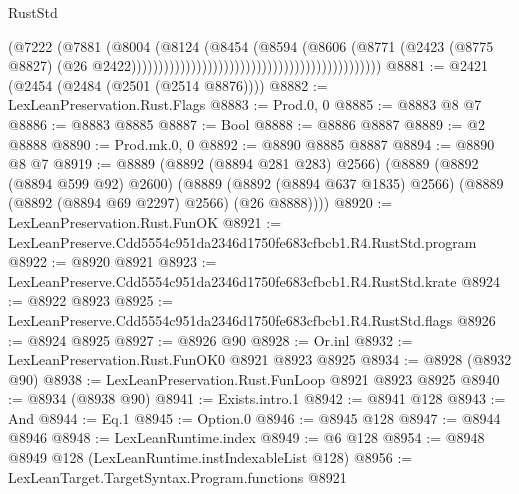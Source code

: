 \begin{lexlean}{RustStd}
\begin{coremodule}
                                                                            (@7222
                                                                              (@7881
                                                                                (@8004
                                                                                  (@8124
                                                                                    (@8454
                                                                                      (@8594
                                                                                        (@8606
                                                                                          (@8771
                                                                                            (@2423
                                                                                              (@8775
                                                                                                @8827)
                                                                                              (@26
                                                                                                @2422))))))))))))))))))))))))))))))))))))))))))))))
@8881 := @2421 (@2454 (@2484 (@2501 (@2514 @8876))))
@8882 := LexLeanPreservation.Rust.Flags
@8883 := Prod.{0, 0}
@8885 := @8883 @8 @7
@8886 := @8883 @8885
@8887 := Bool
@8888 := @8886 @8887
@8889 := @2 @8888
@8890 := Prod.mk.{0, 0}
@8892 := @8890 @8885 @8887
@8894 := @8890 @8 @7
@8919 := @8889
    (@8892 (@8894 @281 @283) @2566)
    (@8889
      (@8892 (@8894 @599 @92) @2600)
      (@8889 (@8892 (@8894 @637 @1835) @2566) (@8889 (@8892 (@8894 @69 @2297) @2566) (@26 @8888))))
@8920 := LexLeanPreservation.Rust.FunOK
@8921 := LexLeanPreserve.Cdd5554c951da2346d1750fe683cfbcb1.R4.RustStd.program
@8922 := @8920 @8921
@8923 := LexLeanPreserve.Cdd5554c951da2346d1750fe683cfbcb1.R4.RustStd.krate
@8924 := @8922 @8923
@8925 := LexLeanPreserve.Cdd5554c951da2346d1750fe683cfbcb1.R4.RustStd.flags
@8926 := @8924 @8925
@8927 := @8926 @90
@8928 := Or.inl
@8932 := LexLeanPreservation.Rust.FunOK0 @8921 @8923 @8925
@8934 := @8928 (@8932 @90)
@8938 := LexLeanPreservation.Rust.FunLoop @8921 @8923 @8925
@8940 := @8934 (@8938 @90)
@8941 := Exists.intro.{1}
@8942 := @8941 @128
@8943 := And
@8944 := Eq.{1}
@8945 := Option.{0}
@8946 := @8945 @128
@8947 := @8944 @8946
@8948 := LexLeanRuntime.index
@8949 := @6 @128
@8954 := @8948 @8949 @128 (LexLeanRuntime.instIndexableList @128)
@8956 := LexLeanTarget.TargetSyntax.Program.functions @8921

\end{coremodule}
\end{lexlean}
